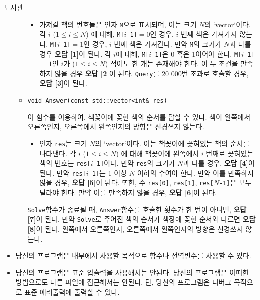 \begin{problem}{도서관}
\begin{itemize}
\begin{itemize}
			\begin{itemize}
				\item 가져갈 책의 번호들은 인자 \texttt{M}으로 표시되며, 이는 크기 $N$의 `vector`이다. 각 $i$ ($1 \le i \le N$) 에 대해, \texttt{M[}$i$\texttt{-1]}$=0$인 경우, $i$ 번째 책은 가져가지 않는다. \texttt{M[}$i$\texttt{-1]}$=1$인 경우, $i$ 번째 책은 가져간다. 만약 \texttt{M}의 크기가 $N$과 다를 경우 \textbf{오답 [1]}이 된다. 각 $i$에 대해, \texttt{M[}$i$\texttt{-1]}은 0 혹은 1이어야 한다. \texttt{M[}$i$\texttt{-1]}$=1$인 $i$가 ($1 \le i \le N$) 적어도 한 개는 존재해야 한다. 이 두 조건을 만족하지 않을 경우 \textbf{오답 [2]}이 된다. \texttt{Query}를 20 000번 초과로 호출할 경우, \textbf{오답 [3]}이 된다.
			\end{itemize}
			
			\item \texttt{void Answer(const std::vector<int\& res)}
			
			이 함수를 이용하여, 책꽂이에 꽂힌 책의 순서를 답할 수 있다. 책이 왼쪽에서 오른쪽인지, 오른쪽에서 왼쪽인지의 방향은 신경쓰지 않는다.
			
			\begin{itemize}
				\item 인자 \texttt{res}는 크기 $N$의 `vector`이다. 이는 책꽂이에 꽂혀있는 책의 순서를 나타낸다. 각 $i$ ($1 \le i \le N$) 에 대해 책꽂이에 왼쪽에서 $i$ 번째로 꽂혀있는 책의 번호는 \texttt{res[}$i$\texttt{-1]}이다. 만약 \texttt{res}의 크기가 $N$과 다를 경우, \textbf{오답 [4]}이 된다. 만약 \texttt{res[}$i$\texttt{-1]}는 1 이상 $N$ 이하의 수여야 한다. 만약 이를 만족하지 않을 경우, \textbf{오답 [5]}이 된다. 또한, 수 \texttt{res[0]}, \texttt{res[1]}, \texttt{res[}$N$\texttt{-1]}은 모두 달라야 한다. 만약 이를 만족하지 않을 경우, \textbf{오답 [6]}이 된다.
			\end{itemize}
			
			\texttt{Solve}함수가 종료될 때, \texttt{Answer}함수를 호출한 횟수가 한 번이 아니면, \textbf{오답 [7]}이 된다.
			만약 \texttt{Solve}로 주어진 책의 순서가 책장에 꽂힌 순서와 다르면 \textbf{오답 [8]}이 된다. 왼쪽에서 오른쪽인지, 오른쪽에서 왼쪽인지의 방향은 신경쓰지 않는다.
		\end{itemize}
		
	\end{itemize}
	
	\Notes
	
	\begin{itemize}
		\item 당신의 프로그램은 내부에서 사용할 목적으로 함수나 전역변수를 사용할 수 있다.
		\item 당신의 프로그램은 표준 입출력을 사용해서는 안된다. 당신의 프로그램은 어떠한 방법으로도 다른 파일에 접근해서는 안된다. 단, 당신의 프로그램은 디버그 목적으로 표준 에러출력에 출력할 수 있다.
	\end{itemize}
	

\end{problem}
